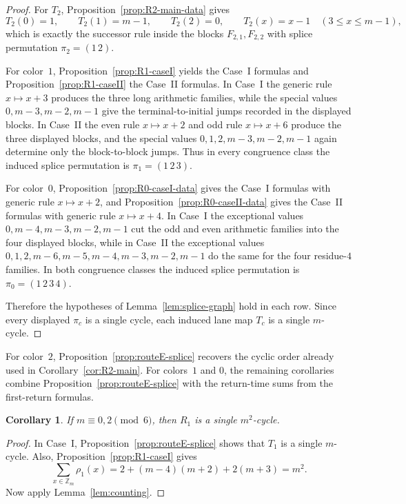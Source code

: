 \documentclass[11pt]{article}
\newtheorem{corollary}{Corollary}
\newcommand{\Zm}{\mathbb Z_m}
\begin{document}
\begin{proof}
For $T_2$, Proposition~\ref{prop:R2-main-data} gives
\[
T_2(0)=1,\qquad T_2(1)=m-1,\qquad T_2(2)=0,\qquad T_2(x)=x-1\quad (3\le x\le m-1),
\]
which is exactly the successor rule inside the blocks $F_{2,1},F_{2,2}$ with splice permutation $\pi_2=(1\,2)$.

For color~$1$, Proposition~\ref{prop:R1-caseI} yields the Case~I formulas and Proposition~\ref{prop:R1-caseII} the Case~II formulas.
In Case~I the generic rule $x\mapsto x+3$ produces the three long arithmetic families, while the special values $0,m-3,m-2,m-1$ give the terminal-to-initial jumps recorded in the displayed blocks.
In Case~II the even rule $x\mapsto x+2$ and odd rule $x\mapsto x+6$ produce the three displayed blocks, and the special values $0,1,2,m-3,m-2,m-1$ again determine only the block-to-block jumps.
Thus in every congruence class the induced splice permutation is $\pi_1=(1\,2\,3)$.

For color~$0$, Proposition~\ref{prop:R0-caseI-data} gives the Case~I formulas with generic rule $x\mapsto x+2$, and Proposition~\ref{prop:R0-caseII-data} gives the Case~II formulas with generic rule $x\mapsto x+4$.
In Case~I the exceptional values $0,m-4,m-3,m-2,m-1$ cut the odd and even arithmetic families into the four displayed blocks, while in Case~II the exceptional values $0,1,2,m-6,m-5,m-4,m-3,m-2,m-1$ do the same for the four residue-$4$ families.
In both congruence classes the induced splice permutation is $\pi_0=(1\,2\,3\,4)$.

Therefore the hypotheses of Lemma~\ref{lem:splice-graph} hold in each row.
Since every displayed $\pi_c$ is a single cycle, each induced lane map $T_c$ is a single $m$-cycle.
\end{proof}

For color~$2$, Proposition~\ref{prop:routeE-splice} recovers the cyclic order already used in Corollary~\ref{cor:R2-main}.
For colors~$1$ and $0$, the remaining corollaries combine Proposition~\ref{prop:routeE-splice} with the return-time sums from the first-return formulas.

\begin{corollary}\label{cor:R1-caseI}
If $m\equiv 0,2\pmod 6$, then $R_1$ is a single $m^2$-cycle.
\end{corollary}

\begin{proof}
In Case~I, Proposition~\ref{prop:routeE-splice} shows that $T_1$ is a single $m$-cycle.
Also, Proposition~\ref{prop:R1-caseI} gives
\[
\sum_{x\in \Zm}\rho_1(x)=2+(m-4)(m+2)+2(m+3)=m^2.
\]
Now apply Lemma~\ref{lem:counting}.
\end{proof}
\end{document}
